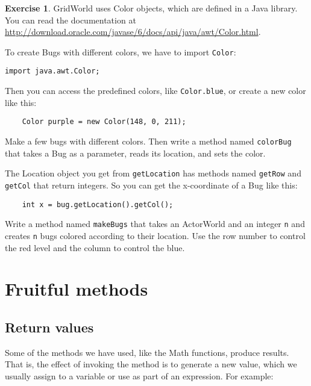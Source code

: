 \documentclass[12pt]{book}
\theoremstyle{definition}
\newtheorem{excz}{Exercise}[chapter]
\newenvironment{exercise}{\bigskip\begin{excz}\mbox{}}{\end{excz}}
\begin{document}
\begin{exercise}

GridWorld uses Color objects, which are defined in a Java library.
You can read the documentation at
\url{http://download.oracle.com/javase/6/docs/api/java/awt/Color.html}.

To create Bugs with different colors, we have to import
{\tt Color}:

\begin{lstlisting}
import java.awt.Color;
\end{lstlisting}

Then you can access the predefined colors, like {\tt Color.blue}, or
create a new color like this:

\begin{lstlisting}
    Color purple = new Color(148, 0, 211);
\end{lstlisting}

Make a few bugs with different colors.  Then write a method named
{\tt colorBug} that takes a Bug as a parameter, reads its location,
and sets the color.

The Location object you get from
{\tt getLocation} has methods named {\tt getRow} and {\tt getCol} that
return integers.  So you can get the x-coordinate of a Bug like this:

\begin{lstlisting}
    int x = bug.getLocation().getCol();
\end{lstlisting}

Write a method named {\tt makeBugs} that takes an ActorWorld and an
integer {\tt n} and creates {\tt n} bugs colored according to their
location.  Use the row number to control the red level and the column
to control the blue.

\end{exercise}



\chapter{Fruitful methods}
\label{chap05}

\section{Return values}

Some of the methods we have used, like the Math
functions, produce results.  That is, the effect of
invoking the method is to generate a new value, which we
usually assign to a variable or use as part of an expression.
For example:
\end{document}

